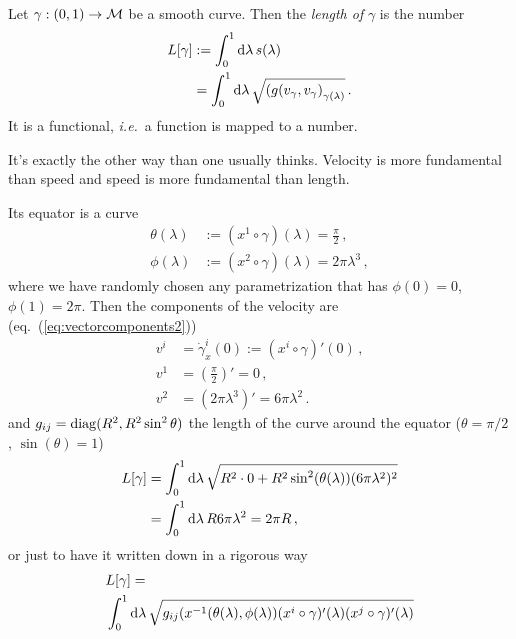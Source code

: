 \begin{defn}
    Let $\gamma: (0,1)\to \mathcal{M}$ be a smooth curve.
    Then the \textit{length of} $\gamma$ is the number
    \begin{align}
        L[\gamma] &:= \int_0^1 \operatorname{d\!} \lambda\, s(\lambda) \\
        &= \int_0^1\operatorname{d\!} \lambda\, \sqrt{\left( g(v_\gamma,v_\gamma \right)_{\gamma(\lambda)}}\,.\nonumber
            \label{eq:lengthCurve}
    \end{align}
    It is a functional, \textit{i.e.}\ a function is mapped to a number.
\end{defn}
\begin{note}
    It's exactly the other way than one usually thinks.
    Velocity is more fundamental than speed and speed is more fundamental than
    length.
\end{note}

\begin{example}
Its equator is a curve
\begin{align}
    \theta(\lambda) &:= (x^1\circ \gamma)(\lambda) = \frac{\pi}{2}\,,\\
    \phi(\lambda) &:= (x^2\circ\gamma)(\lambda) = 2\pi \lambda^3\,,
\end{align}
where we have randomly chosen any parametrization that has
$\phi(0) = 0$, $\phi(1) = 2\pi$.
Then the components of the velocity are (eq.~(\ref{eq:vectorcomponents2}))
\begin{align*}
    v^i &= \dot{\gamma}_x^i (0) := (x^i\circ\gamma)'(0)\,,\\
    v^1 &= \left( \frac{\pi}{2} \right)' = 0\,,\\
    v^2 &= \left( 2\pi \lambda^3 \right)' = 6\pi \lambda^2\,.
\end{align*}
and $g_{ij} = \operatorname{diag}(R^2, R^2 \sin^2\theta)$ the length of the curve around the equator
($\theta = \pi/2$, $\sin(\theta) = 1$)
\begin{align*}
    L[\gamma] &= \int_0^1\operatorname{d\!}\lambda\,\sqrt{R^2\cdot 0 + R^2 \sin^2(\theta(\lambda))(6\pi\lambda^2)^2}\\
    &= \int_0^1\operatorname{d\!}\lambda\, R 6 \pi \lambda^2 = 2\pi R\,,
\end{align*}
or just to have it written down in a rigorous way
\begin{align*}
    &L[\gamma] =\\
    &\int_0^1\operatorname{d\!}\lambda\,\sqrt{g_{ij}(x^{-1}(\theta(\lambda),\phi(\lambda))(x^i\circ\gamma)'(\lambda)
        (x^j\circ\gamma)'(\lambda)}
\end{align*}
\end{example}

